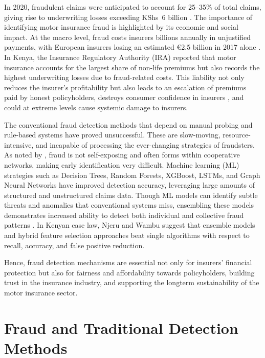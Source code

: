 \documentclass[12pt,a4paper,oneside]{report}
\numberwithin{equation}{chapter}
\begin{document}
In 2020, fraudulent claims were anticipated to account for 25--35\% of total claims, giving rise
to underwriting losses exceeding KShs~6 billion \cite{njeru2022detection}. The importance of
identifying motor insurance fraud is highlighted by its economic and social impact. At the macro
level, fraud costs insurers billions annually in unjustified payments, with European insurers
losing an estimated \euro{}2.5 billion in 2017 alone \cite{schrijver2024automobile}. In Kenya,
the Insurance Regulatory Authority (IRA) reported that motor insurance accounts for the largest
share of non-life premiums but also records the highest underwriting losses due to fraud-related
costs. This liability not only reduces the insurer's profitability but also leads to an escalation
of premiums paid by honest policyholders, destroys consumer confidence in insurers
\cite{bsc2025ensemble}, and could at extreme levels cause systemic damage to insurers.

The conventional fraud detection methods that depend on manual probing and rule-based systems have
proved unsuccessful. These are slow-moving, resource-intensive, and incapable of processing the
ever-changing strategies of fraudsters. As noted by \cite{schrijver2024automobile}, fraud is not
self-exposing and often forms within cooperative networks, making early identification very
difficult. Machine learning (ML) strategies such as Decision Trees, Random Forests, XGBoost,
LSTMs, and Graph Neural Networks have improved detection accuracy, leveraging large amounts of
structured and unstructured claims data. Though ML models can identify subtle threats and anomalies
that conventional systems miss, ensembling these models demonstrates increased ability to detect
both individual and collective fraud patterns \cite{bsc2025ensemble}. In Kenyan case law,
Njeru \cite{njeru2022detection} and Wambu \cite{bsc2025ensemble} suggest that ensemble models
and hybrid feature selection approaches beat single algorithms with respect to recall, accuracy,
and false positive reduction.

Hence, fraud detection mechanisms are essential not only for insurers' financial protection but
also for fairness and affordability towards policyholders, building trust in the insurance
industry, and supporting the longterm sustainability of the motor insurance sector.

\section{Fraud and Traditional Detection Methods}
\end{document}
